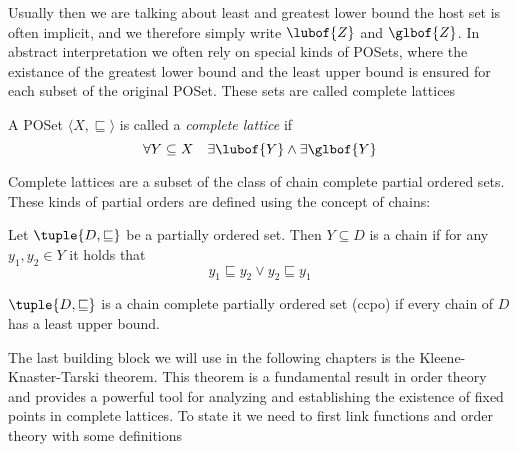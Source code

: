 Usually then we are talking about least and greatest lower bound the
host set is often implicit, and we therefore simply write
\(\lubof{Z}\) and \(\glbof{Z}\).  In abstract interpretation we often
rely on special kinds of POSets, where the existance of the greatest
lower bound and the least upper bound is ensured for each subset of
the original POSet. These sets are called complete lattices

\begin{definition}
  A POSet \(\langle X, \sqsubseteq\rangle\) is called a \emph{complete
  lattice} if \[\forall Y \subseteq X \quad \exists \lubof{Y} \wedge
  \exists \glbof{Y}\]
\end{definition}

Complete lattices are a subset of the class of chain complete partial
ordered sets. These kinds of partial orders are defined using the
concept of chains:

\begin{definition}[Chain]
  Let \(\tuple{D, \sqsubseteq}\) be a partially ordered set. Then
  \(Y\subseteq D\) is a chain if for any \(y_1, y_2 \in Y\) it holds
  that
  \begin{equation*}
    y_1 \sqsubseteq y_2 \vee y_2 \sqsubseteq y_1
  \end{equation*}
\end{definition}

\begin{definition}
  \(\tuple{D, \sqsubseteq}\) is a chain complete partially ordered set
  (ccpo) if every chain of \(D\) has a least upper bound.
\end{definition}



The last building block we will use in the following chapters is the
Kleene-Knaster-Tarski theorem. This theorem is a fundamental result in
order theory and provides a powerful tool for analyzing and
establishing the existence of fixed points in complete lattices. To
state it we need to first link functions and order theory with some
definitions

